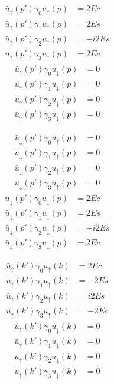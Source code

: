 \begin{minipage}[t]{0.48\textwidth}
\begin{align*}
    \bar{u}_\uparrow (p') \gamma_0 {u}_\uparrow (p) & = 2Ec \\
    \bar{u}_\uparrow (p') \gamma_1 {u}_\uparrow (p) & = 2Es \\
    \bar{u}_\uparrow (p') \gamma_2 {u}_\uparrow (p) & = -i2Es \\
    \bar{u}_\uparrow (p') \gamma_3 {u}_\uparrow (p) & = 2Ec
\end{align*}
\begin{align*}
    \bar{u}_\uparrow(p') \gamma_0 {u}_\downarrow (p) & = 0 \\
    \bar{u}_\uparrow(p') \gamma_1 {u}_\downarrow (p) & = 0 \\
    \bar{u}_\uparrow(p') \gamma_2 {u}_\downarrow (p) & = 0 \\
    \bar{u}_\uparrow(p') \gamma_3 {u}_\downarrow (p) & = 0
\end{align*}
\end{minipage}\hfill
\begin{minipage}[t]{0.48\textwidth}
\begin{align*}
    \bar{u}_\downarrow (p') \gamma_0 {u}_\uparrow (p) & = 0 \\
    \bar{u}_\downarrow (p') \gamma_1 {u}_\uparrow (p) & = 0 \\
    \bar{u}_\downarrow (p') \gamma_2 {u}_\uparrow (p) & = 0 \\
    \bar{u}_\downarrow (p') \gamma_3 {u}_\uparrow (p) & = 0
\end{align*}
\begin{align*}
    \bar{u}_\downarrow(p') \gamma_0 {u}_\downarrow (p) & = 2Ec \\
    \bar{u}_\downarrow(p') \gamma_1 {u}_\downarrow (p) & = 2Es \\
    \bar{u}_\downarrow(p') \gamma_2 {u}_\downarrow (p) & = -i2Es \\
    \bar{u}_\downarrow(p') \gamma_3 {u}_\downarrow (p) & = 2Ec
\end{align*}
\end{minipage}
\vspace{1em}
\begin{minipage}[t]{0.48\textwidth}
\begin{align*}
    \bar{u}_\uparrow (k') \gamma_0 {u}_\uparrow (k) & = 2Ec \\
    \bar{u}_\uparrow (k') \gamma_1 {u}_\uparrow (k) & = -2Es \\
    \bar{u}_\uparrow (k') \gamma_2 {u}_\uparrow (k) & = i2Es \\
    \bar{u}_\uparrow (k') \gamma_3 {u}_\uparrow (k) & = -2Ec
\end{align*}
\begin{align*}
    \bar{u}_\uparrow(k') \gamma_0 {u}_\downarrow (k) & = 0 \\
    \bar{u}_\uparrow(k') \gamma_1 {u}_\downarrow (k) & = 0 \\
    \bar{u}_\uparrow(k') \gamma_2 {u}_\downarrow (k) & = 0 \\
    \bar{u}_\uparrow(k') \gamma_3 {u}_\downarrow (k) & = 0
\end{align*}
\end{minipage}\hfill
